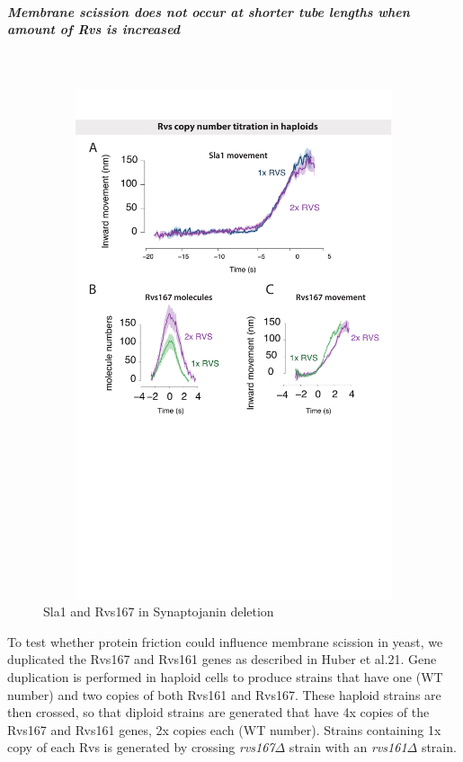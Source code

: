 	\subparagraph{Membrane scission does not occur at shorter tube lengths when amount of Rvs is increased}
		\mbox{}\\
		
				\begin{figure}
			\centering
			\includegraphics[width=15cm,height=15cm,keepaspectratio]{figures/results_final/rvs_haploid}
			\caption[Overexpression of the Rvs complex]
			{Sla1 and Rvs167 in Synaptojanin deletion
			 \label{fig5}}
			\end{figure}	
		

	To test whether protein friction could influence membrane scission in yeast, we duplicated the Rvs167 and Rvs161 genes as described in Huber et al.21. Gene duplication is performed in haploid cells to produce strains that have one (WT number) and two copies of both Rvs161 and Rvs167. These haploid strains are then crossed, so that diploid strains are generated that have 4x copies of the Rvs167 and Rvs161 genes, 2x copies each (WT number). Strains containing 1x copy of each Rvs is generated by crossing \textit{rvs167$\Delta$} strain with an \textit{rvs161$\Delta$} strain.
	



